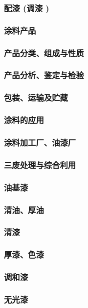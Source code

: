 \documentclass[UTF8]{../../ApplicationUniverse}
\begin{document}
        \subsubsection{配漆 (调漆 )}
    \subsubsection{涂料产品}
        \subsubsection{产品分类、组成与性质}
        \subsubsection{产品分析、鉴定与检验}
        \subsubsection{包装、运输及贮藏}
        \subsubsection{涂料的应用}
    \subsubsection{涂料加工厂、油漆厂}
    \subsubsection{三废处理与综合利用}
\subsubsection{油基漆}
    \subsubsection{清油、厚油}
    \subsubsection{清漆}
    \subsubsection{厚漆、色漆}
    \subsubsection{调和漆}
    \subsubsection{无光漆}
\end{document}
